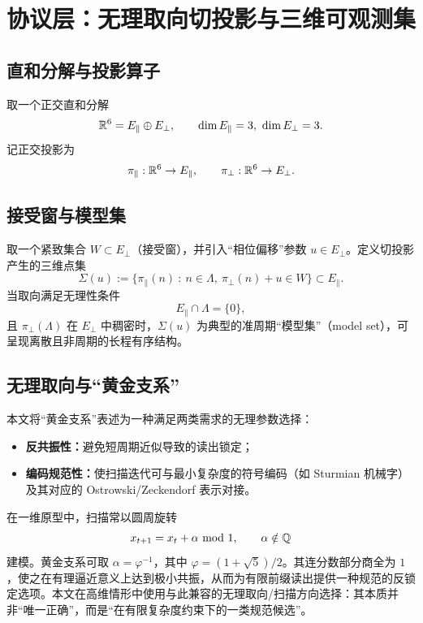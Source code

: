 \section{协议层：无理取向切投影与三维可观测集}

\subsection{直和分解与投影算子}

取一个正交直和分解
\[
\mathbb{R}^{6}=E_{\parallel}\oplus E_{\perp},\qquad \dim E_{\parallel}=3,\ \dim E_{\perp}=3.
\]
记正交投影为
\[
\pi_{\parallel}:\mathbb{R}^{6}\to E_{\parallel},\qquad \pi_{\perp}:\mathbb{R}^{6}\to E_{\perp}.
\]

\subsection{接受窗与模型集}

取一个紧致集合 $W\subset E_{\perp}$（接受窗），并引入“相位偏移”参数 $u\in E_{\perp}$。定义切投影产生的三维点集
\[
\Sigma(u):=\Big\{\pi_{\parallel}(n)\ :\ n\in\Lambda,\ \pi_{\perp}(n)+u\in W\Big\}\subset E_{\parallel}.
\]
当取向满足无理性条件
\[
E_{\parallel}\cap \Lambda = \{0\},
\]
且 $\pi_{\perp}(\Lambda)$ 在 $E_{\perp}$ 中稠密时，$\Sigma(u)$ 为典型的准周期“模型集”（model set），可呈现离散且非周期的长程有序结构。

\subsection{无理取向与“黄金支系”}

本文将“黄金支系”表述为一种满足两类需求的无理参数选择：
\begin{itemize}
  \item \textbf{反共振性：}避免短周期近似导致的读出锁定；
  \item \textbf{编码规范性：}使扫描迭代可与最小复杂度的符号编码（如 Sturmian 机械字）及其对应的 Ostrowski/Zeckendorf 表示对接。
\end{itemize}

在一维原型中，扫描常以圆周旋转
\[
x_{t+1}=x_t+\alpha\ \mathrm{mod}\ 1,\qquad \alpha\notin \mathbb{Q}
\]
建模。黄金支系可取 $\alpha=\varphi^{-1}$，其中 $\varphi=(1+\sqrt{5})/2$。其连分数部分商全为 $1$，使之在有理逼近意义上达到极小共振，从而为有限前缀读出提供一种规范的反锁定选项。本文在高维情形中使用与此兼容的无理取向/扫描方向选择：其本质并非“唯一正确”，而是“在有限复杂度约束下的一类规范候选”。

